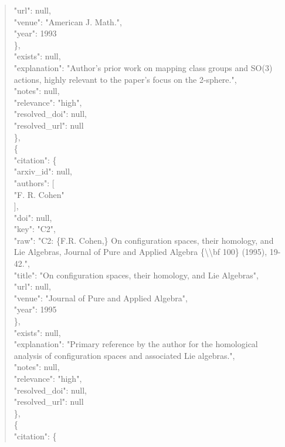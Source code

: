 \documentclass[11pt]{article}
\begin{document}
\begin{quote}
        "url": null,\\
        "venue": "American J. Math.",\\
        "year": 1993\\
      \},\\
      "exists": null,\\
      "explanation": "Author's prior work on mapping class groups and SO(3) actions, highly relevant to the paper's focus on the 2-sphere.",\\
      "notes": null,\\
      "relevance": "high",\\
      "resolved\_doi": null,\\
      "resolved\_url": null\\
    \},\\
    \{\\
      "citation": \{\\
        "arxiv\_id": null,\\
        "authors": [\\
          "F. R. Cohen"\\
        ],\\
        "doi": null,\\
        "key": "C2",\\
        "raw": "C2: \{F.R. Cohen,\} On configuration spaces, their homology, and Lie Algebras, Journal of Pure and Applied Algebra \{\textbackslash{}\textbackslash{}bf 100\} (1995), 19-42.",\\
        "title": "On configuration spaces, their homology, and Lie Algebras",\\
        "url": null,\\
        "venue": "Journal of Pure and Applied Algebra",\\
        "year": 1995\\
      \},\\
      "exists": null,\\
      "explanation": "Primary reference by the author for the homological analysis of configuration spaces and associated Lie algebras.",\\
      "notes": null,\\
      "relevance": "high",\\
      "resolved\_doi": null,\\
      "resolved\_url": null\\
    \},\\
    \{\\
      "citation": \{\\

\end{quote}
\end{document}
